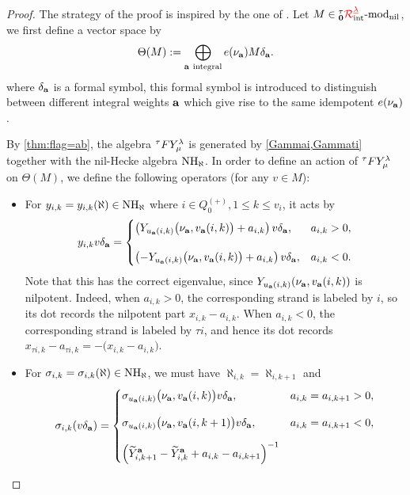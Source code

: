 \begin{proof}
    The strategy of the proof is inspired by the one of \cite[Lem. 5.17]{KTWWY19}. Let $M\in {{}^\tau_{\mathbf{0}}{\color{red}\mathcal{R}}^{{{\color{red}\underline{\lambda}}}}_{\text{int}}}\text{-mod}_{\text{nil}}$, we first define a vector space by 
    \[
   \Theta(M):=
\bigoplus_{\mathbf{a}\ \mathrm{integral}}
e(\nu_{\mathbf{a}})M\delta_{\mathbf{a}}.
    \]
    where $\delta_{\mathbf{a}}$ is a formal symbol, this formal symbol is introduced to distinguish between different integral weights $\mathbf{a}$ which give rise to the same idempotent $e(\nu_{\mathbf{a}})$.

    By \cref{thm:flag=ab}, the algebra ${}^\tau F Y_\mu^\lambda$ is generated by \cref{Gammai,Gammati} together with the nil-Hecke algebra $\operatorname{NH}_\aleph$. In order to define an action of ${}^\tau F Y_\mu^\lambda$ on $\Theta(M)$, we define the following operators (for any $v\in M$):
    \begin{itemize}
        \item For $y_{i,k}=y_{i,k}(\aleph)\in \operatorname{NH}_\aleph$ where $i\in Q_0^{(+)}, 1\leq k \leq v_i$, it acts by 
       \begin{equation}
\label{taco1}
y_{i,k}v\delta_{\mathbf{a}}
=
\begin{cases}
\left(
Y_{u_{\mathbf{a}}(i,k)}
\bigl(\nu_{\mathbf{a}},v_{\mathbf{a}}(i,k)\bigr)
+a_{i,k}
\right)v\delta_{\mathbf{a}},
& a_{i,k}>0,
\\[1.2em]
\left(
-Y_{u_{\mathbf{a}}(i,k)}
\bigl(\nu_{\mathbf{a}},v_{\mathbf{a}}(i,k)\bigr)
+a_{i,k}
\right)v\delta_{\mathbf{a}},
& a_{i,k}<0.
\end{cases}
\end{equation}
        Note that this has the correct eigenvalue, since
  $Y_{u_{\mathbf{a}}(i,k)}(\nu_{\mathbf{a}},v_{\mathbf{a}}(i,k))$ is nilpotent. Indeed, when \(a_{i,k}>0\), the corresponding strand is labeled by \(i\),
so its dot records the nilpotent part \(x_{i,k}-a_{i,k}\). When
\(a_{i,k}<0\), the corresponding strand is labeled by \(\tau i\), and hence its dot records
\(
x_{\tau i,k}-a_{\tau i,k}
=
-\bigl(x_{i,k}-a_{i,k}\bigr).
\)
  \item For $\sigma_{i,k}=\sigma_{i,k}(\aleph)\in \operatorname{NH}_\aleph$, we must have $\aleph_{i,k}=\aleph_{i,k+1}$ and 
\begin{equation}
\label{taco2}
\sigma_{i,k}(v\delta_{\mathbf{a}})
=
\begin{cases}
\displaystyle
\sigma_{u_{\mathbf{a}}(i,k)}
\bigl(\nu_{\mathbf{a}},v_{\mathbf{a}}(i,k)\bigr)v\delta_{\mathbf{a}},
&a_{i,k}=a_{i,k+1}>0,
\\[1em]
\displaystyle
\sigma_{u_{\mathbf{a}}(i,k)}
\bigl(\nu_{\mathbf{a}},v_{\mathbf{a}}(i,k+1)\bigr)v\delta_{\mathbf{a}},
&a_{i,k}=a_{i,k+1}<0,
\\[1em]
\begin{aligned}
\left(
\widetilde Y^{\mathbf{a}}_{i,k+1}
-
\widetilde Y^{\mathbf{a}}_{i,k}
+
a_{i,k}-a_{i,k+1}
\right)^{-1}

\end{aligned}
\end{cases}
\end{equation}
\end{itemize}
\end{proof}
